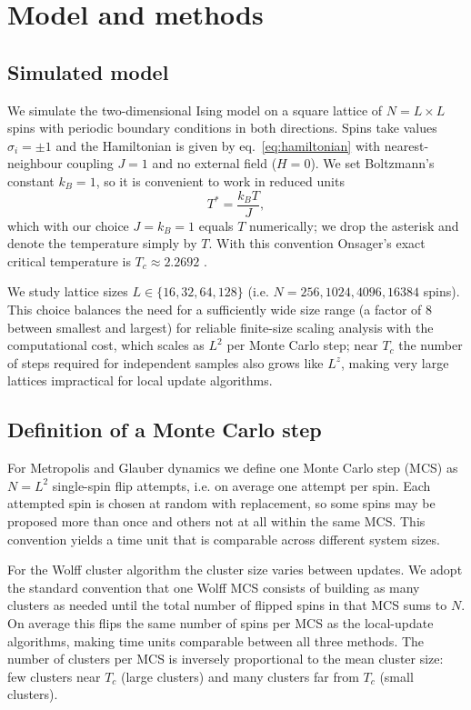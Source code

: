 \chapter{Model and methods} \label{chap:metodos}

\section{Simulated model}

We simulate the two-dimensional Ising model on a square lattice of $N=L\times L$ spins with periodic boundary conditions in both directions. Spins take values $\sigma_i=\pm1$ and the Hamiltonian is given by eq.~\eqref{eq:hamiltonian} with nearest-neighbour coupling $J=1$ and no external field ($H=0$). We set Boltzmann's constant $k_B=1$, so it is convenient to work in reduced units
\[ T^*=\frac{k_B T}{J}, \]
which with our choice $J=k_B=1$ equals $T$ numerically; we drop the asterisk and denote the temperature simply by $T$. With this convention Onsager's exact critical temperature is $T_c\approx2.2692$ \cite{Onsager1944}.

We study lattice sizes $L\in\{16,32,64,128\}$ (i.e. $N=256,1024,4096,16384$ spins). This choice balances the need for a sufficiently wide size range (a factor of 8 between smallest and largest) for reliable finite-size scaling analysis with the computational cost, which scales as $L^2$ per Monte Carlo step; near $T_c$ the number of steps required for independent samples also grows like $L^z$, making very large lattices impractical for local update algorithms.

\section{Definition of a Monte Carlo step} \label{sec:pasomc}

For Metropolis and Glauber dynamics we define one Monte Carlo step (MCS) as $N=L^2$ single-spin flip attempts, i.e. on average one attempt per spin. Each attempted spin is chosen at random with replacement, so some spins may be proposed more than once and others not at all within the same MCS. This convention yields a time unit that is comparable across different system sizes.

For the Wolff cluster algorithm the cluster size varies between updates. We adopt the standard convention that one Wolff MCS consists of building as many clusters as needed until the total number of flipped spins in that MCS sums to $N$. On average this flips the same number of spins per MCS as the local-update algorithms, making time units comparable between all three methods. The number of clusters per MCS is inversely proportional to the mean cluster size: few clusters near $T_c$ (large clusters) and many clusters far from $T_c$ (small clusters).

